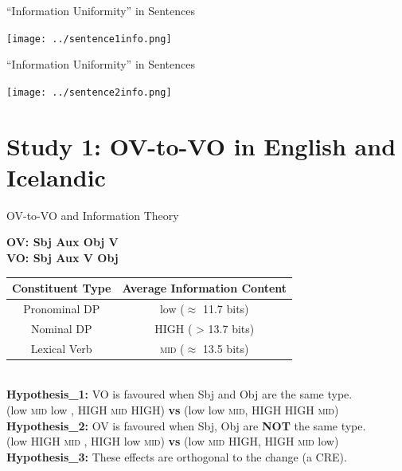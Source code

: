 \documentclass[hyperref={pdfpagelabels=false}]{beamer}
\begin{document}
\begin{frame}{``Information Uniformity'' in Sentences} 

\begin{center}
\texttt{[image: ../sentence1info.png]} 
\end{center}

\end{frame}

\begin{frame}{``Information Uniformity'' in Sentences} 

\begin{center}
	\texttt{[image: ../sentence2info.png]} 
\end{center}

\end{frame}


\section{Study 1: OV-to-VO in English and Icelandic}


\begin{frame}{OV-to-VO and Information Theory} 
	
	\begin{center}
		
		 \textbf{OV: Sbj Aux Obj V}\\
		\textbf{VO: Sbj Aux V Obj}\\\vspace*{5mm}\pause
\begin{tabular}{c c}
	
	\textbf{Constituent Type} & \textbf{Average Information Content} \\ \hline
	Pronominal DP & low ($\approx$ 11.7 bits)\\
	Nominal DP & HIGH ( > 13.7 bits) \\
	Lexical  Verb & \textsc{mid} ($\approx$ 13.5 bits) \\
\end{tabular}\pause
\\\vspace*{5mm}
\textbf{Hypothesis_1:} VO is favoured when Sbj and Obj are the same type.\pause\\\vspace*{1mm} (low \textsc{mid} low , HIGH \textsc{mid} HIGH) \textbf{vs} (low low \textsc{mid}, HIGH HIGH \textsc{mid})  \\\vspace*{4mm}\pause
\textbf{Hypothesis_2:} OV is favoured when Sbj, Obj are \textbf{NOT} the same type.\pause\\\vspace{1mm} (low HIGH \textsc{mid} , HIGH low \textsc{mid}) \textbf{vs} (low \textsc{mid} HIGH, HIGH \textsc{mid} low)\\\vspace*{4mm}\pause
\textbf{Hypothesis_3:} These effects are orthogonal to the change (a CRE).
\end{center}
\end{frame}
\end{document}

